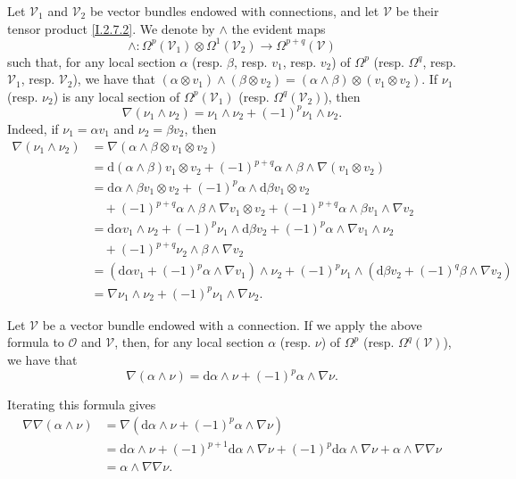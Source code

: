 \documentclass{report}
\theoremstyle{plain}
\theoremstyle{definition}
\newenvironment{env}[1]
    {\renewcommand\theinnercustomenv{#1}\innercustomenv}
    {\endinnercustomenv}
\newcommand{\sh}{\mathscr}
\newcommand{\dd}{\mathrm{d}}
\newcommand{\oldpage}[1]{\marginpar{\footnotesize$\Big\vert$ \textit{p.~#1}}}
\begin{document}
\begin{env}{2.10}
  Let $\sh{V}_1$ and $\sh{V}_2$ be vector bundles endowed with connections, and let $\sh{V}$ be their tensor product \cref{I.2.7.2}.
  We denote by $\wedge$ the evident maps
  \[
    \wedge\colon \Omega^p(\sh{V}_1)\otimes\Omega^1(\sh{V}_2) \to \Omega^{p+q}(\sh{V})
  \]
\oldpage{10}
  such that, for any local section $\alpha$ (resp. $\beta$, resp. $v_1$, resp. $v_2$) of $\Omega^p$ (resp. $\Omega^q$, resp. $\sh{V}_1$, resp. $\sh{V}_2$), we have that $(\alpha\otimes v_1)\wedge(\beta\otimes v_2) = (\alpha\wedge\beta)\otimes(v_1\otimes v_2)$.
  If $\nu_1$ (resp. $\nu_2$) is any local section of $\Omega^p(\sh{V}_1)$ (resp. $\Omega^q(\sh{V}_2)$), then
  \[
  \label{I.2.10.3}
    \nabla(\nu_1\wedge\nu_2) = \nu_1\wedge\nu_2 + (-1)^p\nu_1\wedge\nu_2.
  \tag{2.10.3}
  \]
  Indeed, if $\nu_1=\alpha v_1$ and $\nu_2=\beta v_2$, then
  \[
    \begin{aligned}
      \nabla(\nu_1\wedge\nu_2)
      &= \nabla(\alpha\wedge\beta\otimes v_1\otimes v_2)
    \\&= \dd(\alpha\wedge\beta)v_1\otimes v_2 + (-1)^{p+q}\alpha\wedge\beta\wedge\nabla(v_1\otimes v_2)
    \\&= \dd\alpha\wedge\beta v_1\otimes v_2 + (-1)^p\alpha\wedge\dd\beta v_1\otimes v_2
    \\&\quad+ (-1)^{p+q}\alpha\wedge\beta\wedge\nabla v_1\otimes v_2 + (-1)^{p+q}\alpha\wedge\beta v_1\wedge\nabla v_2
    \\&= \dd\alpha v_1\wedge\nu_2 + (-1)^p\nu_1\wedge\dd\beta v_2 + (-1)^p\alpha\wedge\nabla v_1\wedge\nu_2
    \\&\quad+ (-1)^{p+q}\nu_2\wedge\beta\wedge\nabla v_2
    \\&= (\dd\alpha v_1 + (-1)^p\alpha\wedge\nabla v_1)\wedge\nu_2 + (-1)^p\nu_1\wedge(\dd\beta v_2 + (-1)^q\beta\wedge\nabla v_2)
    \\&= \nabla\nu_1\wedge\nu_2 +(-1)^p\nu_1\wedge\nabla\nu_2.
    \end{aligned}
  \]

  Let $\sh{V}$ be a vector bundle endowed with a connection.
  If we apply the above formula to $\sh{O}$ and $\sh{V}$, then, for any local section $\alpha$ (resp. $\nu$) of $\Omega^p$ (resp. $\Omega^q(\sh{V})$), we have that
  \[
  \label{I.2.10.4}
    \nabla(\alpha\wedge\nu) = \dd\alpha\wedge\nu + (-1)^p\alpha\wedge\nabla\nu.
  \tag{2.10.4}
  \]

  Iterating this formula gives
  \[
  \label{I.2.10.5}
    \begin{aligned}
      \nabla\nabla(\alpha\wedge\nu)
      &= \nabla(\dd\alpha\wedge\nu + (-1)^p\alpha\wedge\nabla\nu)
      \\&= \dd\alpha\wedge\nu + (-1)^{p+1}\dd\alpha\wedge\nabla\nu + (-1)^p\dd\alpha\wedge\nabla\nu + \alpha\wedge\nabla\nabla\nu
      \\&= \alpha\wedge\nabla\nabla\nu.
    \end{aligned}
  \tag{2.10.5}
  \]
\end{env}
\end{document}
